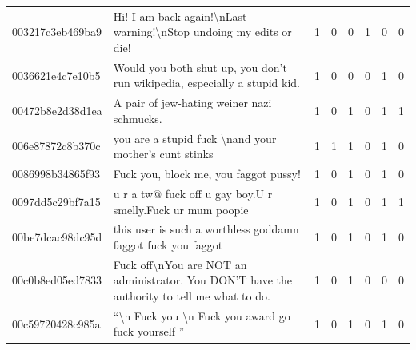 \begin{table}[htb!]
{\begin{minipage}{0.88\textheight}
\begin{threeparttable}
\begin{tabularx}{\textwidth}{L{0.95} L{6.25} C{0.135} C{0.135} C{0.135} C{0.135} C{0.135} C{0.135}}
                    003217c3eb469ba9 & Hi! I am back again!\textbackslash nLast warning!\textbackslash nStop undoing my edits or die!                                   & 1           & 0           & 0           & 1           & 0           & 0           \\
                    0036621e4c7e10b5 & Would you both shut up, you don't run wikipedia, especially a stupid kid.                                                        & 1           & 0           & 0           & 0           & 1           & 0           \\
                    00472b8e2d38d1ea & A pair of jew-hating weiner nazi schmucks.                                                                                       & 1           & 0           & 1           & 0           & 1           & 1           \\
                    006e87872c8b370c & you are a stupid fuck \textbackslash nand your mother's cunt stinks                                                              & 1           & 1           & 1           & 0           & 1           & 0           \\
                    0086998b34865f93 & Fuck you, block me, you faggot pussy!                                                                                            & 1           & 0           & 1           & 0           & 1           & 0           \\
                    0097dd5c29bf7a15 & u r a tw@ fuck off u gay boy.U r smelly.Fuck ur mum poopie                                                                       & 1           & 0           & 1           & 0           & 1           & 1           \\
                    00be7dcac98dc95d & this user is such a worthless goddamn faggot fuck you faggot                                                                     & 1           & 0           & 1           & 0           & 1           & 0           \\
                    00c0b8ed05ed7833 & Fuck off\textbackslash nYou are NOT an administrator. You DON'T have the authority to tell me what to do.                        & 1           & 0           & 1           & 0           & 0           & 0           \\
                    00c59720428c985a & ``\textbackslash n Fuck you \textbackslash n Fuck you award go fuck yourself ''                                                  & 1           & 0           & 1           & 0           & 1           & 0           \\

\end{tabularx}
\end{threeparttable}
\end{minipage}}
\end{table}
